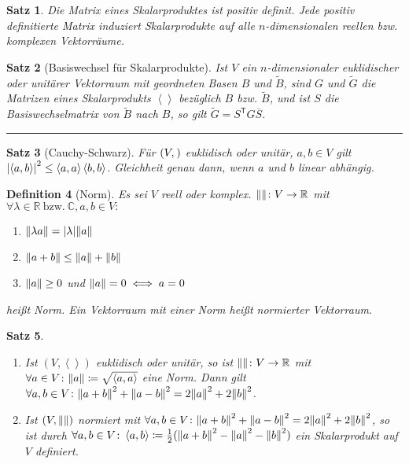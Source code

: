 \documentclass[a4paper]{article}
\newcounter{Sec}
\theoremstyle{marginbreak}
\newtheorem{definition}{Definition}[Sec]
\newtheorem{satz}[definition]{Satz}
\newcommand{\sep}{%
	\rule{\textwidth}{0.3pt}%
	\stepcounter{Sec}%
	}
\newcommand\conj{\overline}
\newcommand\scp[1]{\left\langle#1\right\rangle}
\newcommand\transpose[1]{#1^{\mathsf{T}}}
\begin{document}
	\begin{satz}
		Die Matrix eines Skalarproduktes ist positiv definit. Jede positiv definitierte
		Matrix induziert Skalarprodukte auf alle $n$-dimensionalen reellen bzw. komplexen
		Vektorräume.
	\end{satz}
	\begin{satz}[Basiswechsel für Skalarprodukte]
		Ist $V$ ein $n$-dimensionaler euklidischer oder unitärer Vektorraum mit
		geordneten Basen $B$ und $\tilde{B}$, sind $G$ und $\tilde{G}$ die Matrizen
		eines Skalarprodukts $\scp{}$ bezüglich $B$ bzw. $\tilde{B}$, und ist $S$ die Basiswechselmatrix
		von $\tilde{B}$ nach $B$, so gilt $\tilde{G} = \transpose{S}G\conj{S}$.
	\end{satz}
	\sep
	\begin{satz}[Cauchy-Schwarz]
		Für $(V, \sp{})$ euklidisch oder unitär, $a, b\in V$ gilt $\abs{\scp{a, b}}^2\leq\scp{a, a}\scp{b, b}$.
		Gleichheit genau dann, wenn $a$ und $b$ linear abhängig.
	\end{satz}
	\begin{definition}[Norm]
		Es sei $V$ reell oder komplex. $\norm{}\colon V\to\mathbb{R}$ mit
		$\forall\lambda\in\mathbb{R}\ \text{bzw.}\ \mathbb{C}, a, b\in V\colon$
		\begin{enumerate}[label=(\alph*)]
			\item $\norm{\lambda a} = \abs{\lambda}\norm{a}$
			\item $\norm{a + b} \leq \norm{a} + \norm{b}$
			\item $\norm{a} \geq 0$ und $\norm{a} = 0\iff a = 0$
		\end{enumerate}
		heißt Norm. Ein Vektorraum mit einer Norm heißt normierter Vektorraum.
	\end{definition}
	\begin{satz}
		\begin{enumerate}[label=(\alph*)]
			\item Ist $(V, \scp{})$ euklidisch oder unitär, so ist $\norm{}\colon V\to\mathbb{R}$ mit
				$\forall a\in V\colon\norm{a}\coloneqq\sqrt{\scp{a, a}}$ eine Norm. Dann gilt
				$\forall a, b\in V\colon \norm{a + b}^2 + \norm{a - b}^2 = 2\norm{a}^2 + 2\norm{b}^2$.
			\item Ist $(V, \norm{})$ normiert mit
				$\forall a, b\in V\colon \norm{a + b}^2 + \norm{a - b}^2 = 2\norm{a}^2 + 2\norm{b}^2$,
				so ist durch $\forall a, b\in V\colon \scp{a, b}\coloneqq \frac{1}{2}(\norm{a + b}^2 - \norm{a}^2 - \norm{b}^2)$
				ein Skalarprodukt auf $V$ definiert.
		\end{enumerate}
	\end{satz}
\end{document}
